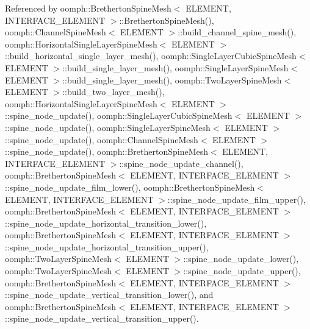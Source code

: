 Referenced by oomph\+::\+Bretherton\+Spine\+Mesh$<$ E\+L\+E\+M\+E\+N\+T, I\+N\+T\+E\+R\+F\+A\+C\+E\+\_\+\+E\+L\+E\+M\+E\+N\+T $>$\+::\+Bretherton\+Spine\+Mesh(), oomph\+::\+Channel\+Spine\+Mesh$<$ E\+L\+E\+M\+E\+N\+T $>$\+::build\+\_\+channel\+\_\+spine\+\_\+mesh(), oomph\+::\+Horizontal\+Single\+Layer\+Spine\+Mesh$<$ E\+L\+E\+M\+E\+N\+T $>$\+::build\+\_\+horizontal\+\_\+single\+\_\+layer\+\_\+mesh(), oomph\+::\+Single\+Layer\+Cubic\+Spine\+Mesh$<$ E\+L\+E\+M\+E\+N\+T $>$\+::build\+\_\+single\+\_\+layer\+\_\+mesh(), oomph\+::\+Single\+Layer\+Spine\+Mesh$<$ E\+L\+E\+M\+E\+N\+T $>$\+::build\+\_\+single\+\_\+layer\+\_\+mesh(), oomph\+::\+Two\+Layer\+Spine\+Mesh$<$ E\+L\+E\+M\+E\+N\+T $>$\+::build\+\_\+two\+\_\+layer\+\_\+mesh(), oomph\+::\+Horizontal\+Single\+Layer\+Spine\+Mesh$<$ E\+L\+E\+M\+E\+N\+T $>$\+::spine\+\_\+node\+\_\+update(), oomph\+::\+Single\+Layer\+Cubic\+Spine\+Mesh$<$ E\+L\+E\+M\+E\+N\+T $>$\+::spine\+\_\+node\+\_\+update(), oomph\+::\+Single\+Layer\+Spine\+Mesh$<$ E\+L\+E\+M\+E\+N\+T $>$\+::spine\+\_\+node\+\_\+update(), oomph\+::\+Channel\+Spine\+Mesh$<$ E\+L\+E\+M\+E\+N\+T $>$\+::spine\+\_\+node\+\_\+update(), oomph\+::\+Bretherton\+Spine\+Mesh$<$ E\+L\+E\+M\+E\+N\+T, I\+N\+T\+E\+R\+F\+A\+C\+E\+\_\+\+E\+L\+E\+M\+E\+N\+T $>$\+::spine\+\_\+node\+\_\+update\+\_\+channel(), oomph\+::\+Bretherton\+Spine\+Mesh$<$ E\+L\+E\+M\+E\+N\+T, I\+N\+T\+E\+R\+F\+A\+C\+E\+\_\+\+E\+L\+E\+M\+E\+N\+T $>$\+::spine\+\_\+node\+\_\+update\+\_\+film\+\_\+lower(), oomph\+::\+Bretherton\+Spine\+Mesh$<$ E\+L\+E\+M\+E\+N\+T, I\+N\+T\+E\+R\+F\+A\+C\+E\+\_\+\+E\+L\+E\+M\+E\+N\+T $>$\+::spine\+\_\+node\+\_\+update\+\_\+film\+\_\+upper(), oomph\+::\+Bretherton\+Spine\+Mesh$<$ E\+L\+E\+M\+E\+N\+T, I\+N\+T\+E\+R\+F\+A\+C\+E\+\_\+\+E\+L\+E\+M\+E\+N\+T $>$\+::spine\+\_\+node\+\_\+update\+\_\+horizontal\+\_\+transition\+\_\+lower(), oomph\+::\+Bretherton\+Spine\+Mesh$<$ E\+L\+E\+M\+E\+N\+T, I\+N\+T\+E\+R\+F\+A\+C\+E\+\_\+\+E\+L\+E\+M\+E\+N\+T $>$\+::spine\+\_\+node\+\_\+update\+\_\+horizontal\+\_\+transition\+\_\+upper(), oomph\+::\+Two\+Layer\+Spine\+Mesh$<$ E\+L\+E\+M\+E\+N\+T $>$\+::spine\+\_\+node\+\_\+update\+\_\+lower(), oomph\+::\+Two\+Layer\+Spine\+Mesh$<$ E\+L\+E\+M\+E\+N\+T $>$\+::spine\+\_\+node\+\_\+update\+\_\+upper(), oomph\+::\+Bretherton\+Spine\+Mesh$<$ E\+L\+E\+M\+E\+N\+T, I\+N\+T\+E\+R\+F\+A\+C\+E\+\_\+\+E\+L\+E\+M\+E\+N\+T $>$\+::spine\+\_\+node\+\_\+update\+\_\+vertical\+\_\+transition\+\_\+lower(), and oomph\+::\+Bretherton\+Spine\+Mesh$<$ E\+L\+E\+M\+E\+N\+T, I\+N\+T\+E\+R\+F\+A\+C\+E\+\_\+\+E\+L\+E\+M\+E\+N\+T $>$\+::spine\+\_\+node\+\_\+update\+\_\+vertical\+\_\+transition\+\_\+upper().


